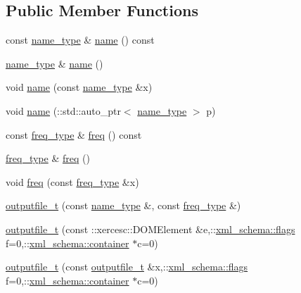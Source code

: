 \subsection*{Public Member Functions}
\begin{DoxyCompactItemize}
\item 
const \hyperlink{classoutputfile__t_a9207f2bca21ee3d91246fae00c13d24b}{name\-\_\-type} \& \hyperlink{classoutputfile__t_a540932c6a4201ae883e9c699d5312c6a}{name} () const 
\item 
\hyperlink{classoutputfile__t_a9207f2bca21ee3d91246fae00c13d24b}{name\-\_\-type} \& \hyperlink{classoutputfile__t_a1247cee1df5cfbd1e9450307dd62abf2}{name} ()
\item 
void \hyperlink{classoutputfile__t_ad19c86ed66220633c4fc0392d2465ea8}{name} (const \hyperlink{classoutputfile__t_a9207f2bca21ee3d91246fae00c13d24b}{name\-\_\-type} \&x)
\item 
void \hyperlink{classoutputfile__t_a419fc94aff44d99a47412bdcba33b5b8}{name} (\-::std\-::auto\-\_\-ptr$<$ \hyperlink{classoutputfile__t_a9207f2bca21ee3d91246fae00c13d24b}{name\-\_\-type} $>$ p)
\item 
const \hyperlink{classoutputfile__t_a6a45c7bbd6bb78b02c32b155fdc19dda}{freq\-\_\-type} \& \hyperlink{classoutputfile__t_a9caa051090cab12b3c3321f33adc075d}{freq} () const 
\item 
\hyperlink{classoutputfile__t_a6a45c7bbd6bb78b02c32b155fdc19dda}{freq\-\_\-type} \& \hyperlink{classoutputfile__t_a2eb1133b18e60b957b7430839262ce0c}{freq} ()
\item 
void \hyperlink{classoutputfile__t_a39ee1f243363e6f030c652ff38483624}{freq} (const \hyperlink{classoutputfile__t_a6a45c7bbd6bb78b02c32b155fdc19dda}{freq\-\_\-type} \&x)
\item 
\hyperlink{classoutputfile__t_a920190ecdf6d02cb5fac5565b9227000}{outputfile\-\_\-t} (const \hyperlink{classoutputfile__t_a9207f2bca21ee3d91246fae00c13d24b}{name\-\_\-type} \&, const \hyperlink{classoutputfile__t_a6a45c7bbd6bb78b02c32b155fdc19dda}{freq\-\_\-type} \&)
\item 
\hyperlink{classoutputfile__t_a6b0b1fec937dd56c8adfc125c2800e95}{outputfile\-\_\-t} (const \-::xercesc\-::\-D\-O\-M\-Element \&e,\-::\hyperlink{namespacexml__schema_a0612287d030cb2732d31a45b258fdc87}{xml\-\_\-schema\-::flags} f=0,\-::\hyperlink{namespacexml__schema_ada9aa30dc722e93ee2ed7243085402a5}{xml\-\_\-schema\-::container} $\ast$c=0)
\item 
\hyperlink{classoutputfile__t_a57993b1ea7023e7aed0a37b2004a5e1c}{outputfile\-\_\-t} (const \hyperlink{classoutputfile__t}{outputfile\-\_\-t} \&x,\-::\hyperlink{namespacexml__schema_a0612287d030cb2732d31a45b258fdc87}{xml\-\_\-schema\-::flags} f=0,\-::\hyperlink{namespacexml__schema_ada9aa30dc722e93ee2ed7243085402a5}{xml\-\_\-schema\-::container} $\ast$c=0)

\end{DoxyCompactItemize}
